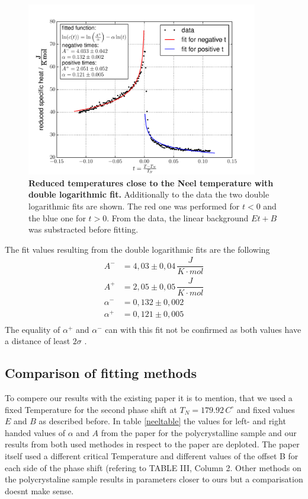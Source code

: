 \documentclass{include/thesisclass3}
\newcommand{\cc}{\cdot}
\newcommand{\e}[1]{\,\si{#1}}
\begin{document}
\begin{figure}[H]
\includegraphics[width = 0.9\textwidth]{fig/loglogfit.pdf}
\caption{\label{neelplot}\textbf{Reduced temperatures close to the Neel temperature with double logarithmic fit.} Additionally to the data the two double logarithmic fits are shown. The red one was performed for $t < 0$ and the blue one for $t > 0$. From the data, the linear background $Et +B$ was substracted before fitting.} 
\end{figure}
The fit values resulting from the double logarithmic fits are the following
\begin{align*}
A^- &= 4,03 \pm 0,04 \e{\dfrac{J}{K\cc mol}}\\
A^+ &= 2,05 \pm 0,05 \e{\dfrac{J}{K\cc mol}}\\
\alpha^- &= 0,132 \pm 0,002\\
\alpha^+ &= 0,121 \pm 0,005\\
\end{align*}
The equality of $\alpha^+$ and $\alpha^-$ can with this fit not be confirmed as both values have a distance of least $2\sigma$ .

\subsection{Comparison of fitting methods}
To compere our results with the existing paper it is to mention, that we used a fixed Temperature for the second phase shift at $T_N = 179.92\e{C^{\circ}}$ and fixed values $E$ and $B$ as described before. In table \ref{neeltable} the values for left- and right handed values of $\alpha$ and $A$ from the paper for the polycrystalline sample and our results from both used methodes in respect to the paper are deploted. The paper itself used a different critical Temperature and different values of the offset B for each side of the phase shift (refering to TABLE III, Column 2. Other methods on the polycrystaline sample results in parameters closer to ours but a comparisation doesnt make sense. 
\end{document}
